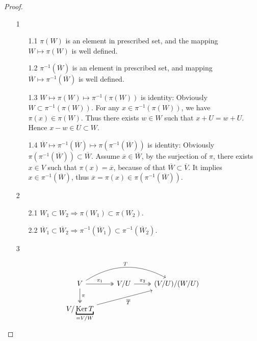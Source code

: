 \begin{proof}
    \hfill

    \begin{enumerate}
        \item[1]
        \begin{enumerate}
            \item[1.1] $\pi(W)$ is an element in prescribed set, and the mapping $W \mapsto \pi(W)$ is well defined.
            \item[1.2] $\pi^{-1}(\overline{W})$ is an element in prescribed set, and mapping $\overline{W} \mapsto \pi^{-1}(\overline{W})$ is well defined.
            \item[1.3] $W \mapsto \pi(W) \mapsto \pi^{-1}(\pi(W))$ is identity: Obviously $W \subset \pi^{-1}(\pi(W))$. For any $x \in \pi^{-1}(\pi (W))$, we have $\pi(x) \in \pi(W)$. Thus there exists $w \in W$ such that $x + U = w + U$. Hence $x - w \in U \subset W$.
            \item[1.4] $\overline{W} \mapsto \pi^{-1}(\overline{W}) \mapsto \pi(\pi^{-1} (\overline{W}))$ is identity: Obviously $\pi(\pi^{-1}(\overline{W})) \subset \overline{W}$.  Assume $\overline{x} \in \overline{W}$, by the surjection of $\pi$, there exists $x \in V$ such that $\pi(x) = \overline{x}$, because of that $\overline{W} \subset \overline{V}$. It implies $x \in \pi^{-1}(\overline{W})$, thus $\overline{x} = \pi(x) \in \pi(\pi^{-1}(\overline{W}))$.
        \end{enumerate}
    \item[2]
    \begin{enumerate}
        \item[2.1] $W_1 \subset W_2 \Rightarrow \pi(W_1) \subset \pi(W_2)$.
        \item[2.2] $\overline{W}_1 \subset \overline{W}_2 \Rightarrow \pi^{-1}(\overline{W}_1) \subset \pi^{-1}(\overline{W}_2)$.  
    \end{enumerate}
    \item[3]
    \end{enumerate}
    \[
    \begin{tikzcd}
        V \arrow[two heads, r, "\pi_1"] \arrow[two heads, d, "\pi"] \arrow[rr, bend left, "T"]
        & V/U \arrow[two heads, r, "\pi_2"]
        & (V/U) / (W/U)
        \\
        V / \underbracket{\Ker T}_{=V/W}  \arrow[rru, "\overline{T}"']
    \end{tikzcd}
    \]
\end{proof}











